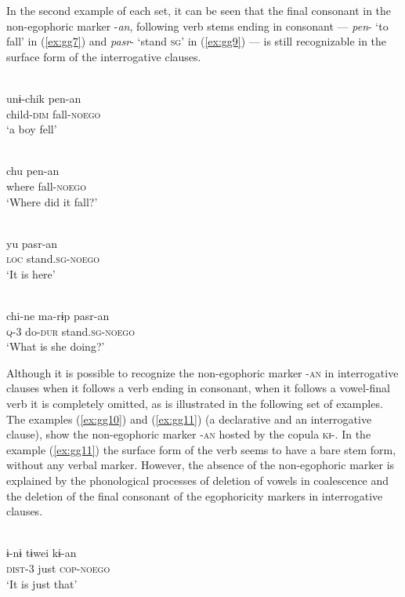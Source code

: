 \documentclass[output=paper]{langsci/langscibook}
\begin{document}
In the second example of each set, it can be seen that the final consonant in the non-egophoric marker -\textit{an}, following verb stems ending in consonant — \textit{pen}- ‘to fall’ in (\ref{ex:gg7}) and \textit{pasr}- ‘stand \textsc{sg}’ in (\ref{ex:gg9}) — is still recognizable in the surface form of the interrogative clauses.

\ea \label{ex:gg6}
    \\
	\gll unɨ-chik pen-an\\
      child-\textsc{dim} fall-\textsc{noego}\\
	\glt ‘a boy fell’
	\z
	
\ea \label{ex:gg7}
    \\
	\gll chu pen-an\\
      where	fall-\textsc{noego}\\
	\glt ‘Where did it fall?’
	\z
	
\ea \label{ex:gg8}
    \\
	\gll yu	pasr-an\\
      \textsc{loc} stand.\textsc{sg-noego}\\
	\glt ‘It is here’
	\z
	
\ea \label{ex:gg9}
    \\
	\gll chi-ne	ma-rɨp pasr-an\\
      \textsc{q}-3 do-\textsc{dur}	stand.\textsc{sg-noego}\\
	\glt ‘What is she doing?’
	\z

Although it is possible to recognize the non-egophoric marker -\textsc{an} in interrogative clauses when it follows a verb ending in consonant, when it follows a vowel-final verb it is completely omitted, as is illustrated in the following set of examples. The examples (\ref{ex:gg10}) and (\ref{ex:gg11}) (a declarative and an interrogative clause), show the non-egophoric marker -\textsc{an} hosted by the copula \textsc{kɨ}-. In the example (\ref{ex:gg11}) the surface form of the verb seems to have a bare stem form, without any verbal marker. However, the absence of the non-egophoric marker is explained by the phonological processes of deletion of vowels in coalescence and the deletion of the final consonant of the egophoricity markers in interrogative clauses. 

\ea \label{ex:gg10}
    \\
	\gll ɨ-nɨ tɨwei	kɨ-an\\
      \textsc{dist}-3 just \textsc{cop-noego}\\
	\glt ‘It is just that’
	\z
	
\end{document}
